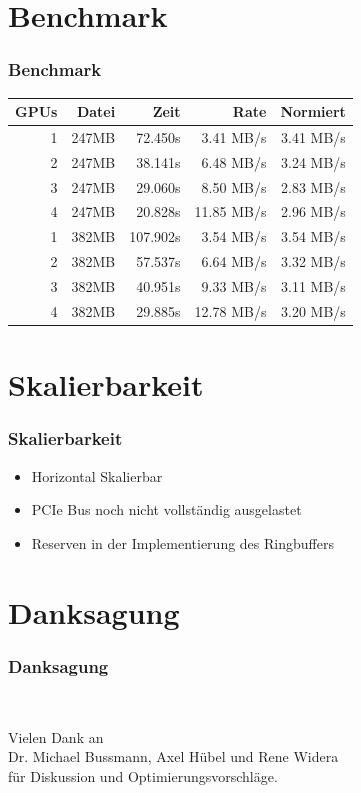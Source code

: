 \documentclass[ddcfooter]{tudbeamer}
\begin{document}
\section{Benchmark}
\begin{frame}
    \frametitle*{Benchmark}
    \begin{center}
    \begin{tabular}{|r|r|r|r|r|}
    \hline
	GPUs & Datei    & Zeit     & Rate       & Normiert  \\
	\hline
	1    & 247MB	& 72.450s  &  3.41 MB/s & 3.41 MB/s \\
	2	 & 247MB	& 38.141s  &  6.48 MB/s & 3.24 MB/s \\
	3	 & 247MB	& 29.060s  &  8.50 MB/s & 2.83 MB/s \\
	4	 & 247MB	& 20.828s  & 11.85 MB/s & 2.96 MB/s \\
	1	 & 382MB	& 107.902s &  3.54 MB/s & 3.54 MB/s \\
	2	 & 382MB	& 57.537s  &  6.64 MB/s & 3.32 MB/s \\
	3	 & 382MB	& 40.951s  &  9.33 MB/s & 3.11 MB/s \\
	4	 & 382MB	& 29.885s  & 12.78 MB/s & 3.20 MB/s \\
	\hline
	\end{tabular}
	\end{center}
\end{frame}
\section{Skalierbarkeit}
\begin{frame}
    \frametitle*{Skalierbarkeit}
    \begin{itemize}
        \item{Horizontal Skalierbar}
        \item{PCIe Bus noch nicht vollständig ausgelastet}
        \item{Reserven in der Implementierung des Ringbuffers}
    \end{itemize}

\end{frame}
\section{Danksagung}

\begin{frame}
    \frametitle*{Danksagung}

    \begin{block} ~
    \begin{center}
    Vielen Dank an \\Dr. Michael Bussmann, Axel Hübel und Rene Widera \\ für Diskussion und Optimierungsvorschläge.
    \end{center}
    \end{block}

\end{frame}
\end{document}

